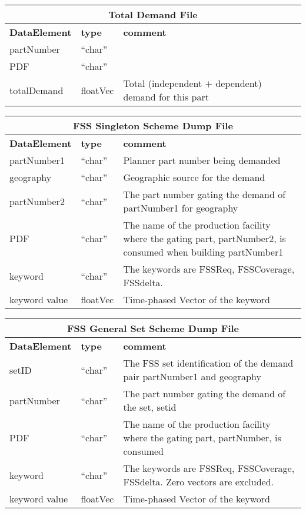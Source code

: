 \vspace{.5in}

\begin{tabular}{llp{4in}}
\multicolumn{3}{c}{{\bf Total Demand File}}\\ \hline\hline
{\bf DataElement} &  {\bf type}  &   {\bf comment} \\ \hline
partNumber &  ``char''     \\ 
PDF   & ``char''  \\
totalDemand & floatVec & Total (independent $+$ dependent) demand for this part
\end{tabular}

\vspace{.5in}

\begin{tabular}{llp{4in}}
\multicolumn{3}{c}{{\bf FSS Singleton Scheme Dump File}}\\ \hline\hline
{\bf DataElement} &  {\bf type}  &   {\bf comment} \\ \hline
partNumber1 & ``char'' & Planner part number being demanded    \\ 
geography & ``char'' & Geographic source for the demand \\
partNumber2 & ``char'' & The part number gating the demand of partNumber1 for
 geography \\
PDF & ``char'' & The name of the production facility where the gating 
 part, partNumber2, is consumed when building partNumber1 \\
keyword & ``char''  & The keywords are FSSReq, FSSCoverage, FSSdelta. \\
keyword value  & floatVec &  Time-phased Vector of the keyword 
\end{tabular}

\vspace{.5in}

\begin{tabular}{llp{4in}}
\multicolumn{3}{c}{{\bf FSS General Set Scheme Dump File}}\\ \hline\hline
{\bf DataElement} &  {\bf type}  &   {\bf comment} \\ \hline
setID & ``char'' & The FSS set identification of the demand pair partNumber1 
  and geography\\
partNumber & ``char'' & The part number gating the demand of the set, setid \\
PDF & ``char'' & The name of the production facility where the gating 
 part, partNumber, is consumed  \\
keyword & ``char''  & The keywords are FSSReq, FSSCoverage, FSSdelta.
    Zero vectors are excluded.\\
keyword value  & floatVec &  Time-phased Vector of the keyword 
\end{tabular}

